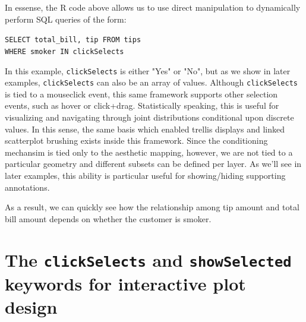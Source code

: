 \documentclass[journal]{vgtc}\usepackage[]{graphicx}\usepackage[]{color}
\begin{document}
In essense, the R code above allows us to use direct manipulation to dynamically perform SQL queries of the form:

\texttt{SELECT total\_bill, tip FROM tips} \\
\hspace*{1cm} \texttt{WHERE smoker IN clickSelects}

In this example, \texttt{clickSelects} is either "Yes" or "No", but as we show in later examples, \texttt{clickSelects} can also be an array of values. Although \texttt{clickSelects} is tied to a mouseclick event, this same framework supports other selection events, such as hover or click+drag. Statistically speaking, this is useful for visualizing and navigating through joint distributions conditional upon discrete values. In this sense, the same basis which enabled trellis displays \citep{trellis} and linked scatterplot brushing \citep{brushing-scatterplots} exists inside this framework. Since the conditioning mechansim is tied only to the aesthetic mapping, however, we are not tied to a particular geometry and different subsets can be defined per layer. As we'll see in later examples, this ability is particular useful for showing/hiding supporting annotations.



As a result, we can quickly see how the relationship among tip amount and total bill amount depends on whether the customer is smoker.







\section{The \texttt{clickSelects} and \texttt{showSelected} keywords for interactive plot design}
\label{sec:design}

\end{document}
